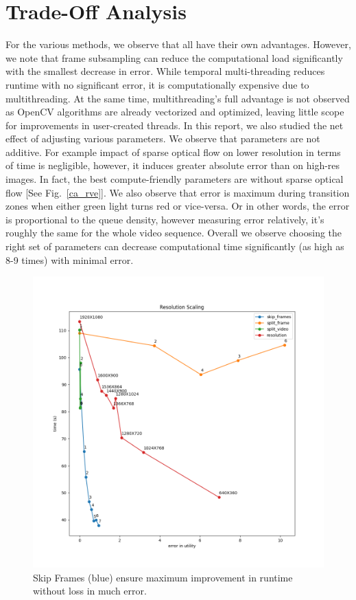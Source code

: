 \documentclass[conference]{IEEEtran}
\begin{document}
\section{Trade-Off Analysis}

For the various methods, we observe that all have their own advantages. However, we note that frame subsampling can reduce the computational load significantly with the smallest decrease in error.
While temporal multi-threading reduces runtime with no significant error, it is computationally expensive due to multithreading. At the same time, multithreading's full advantage is not 
observed as OpenCV algorithms are already vectorized and optimized, leaving little scope for improvements in user-created threads.
In this report, we also studied the net effect of adjusting various parameters. We observe that parameters are not additive. For example impact of sparse optical flow on lower resolution in terms of time is negligible, however, it induces greater absolute error than on high-res images.
In fact, the best compute-friendly parameters are without sparse optical flow [See Fig.~\ref{ca_rve}].
We also observe that error is maximum during transition zones when either green light turns red or vice-versa. Or in other words, the error is proportional to the queue density, however measuring error relatively, it's roughly the same for the whole video sequence. 
Overall we observe choosing the right set of parameters can decrease computational time significantly (as high as 8-9 times) with minimal error.


\begin{figure}[htbp]
\centerline{\includegraphics[scale=0.3]{plots/plot_all.png}}
\caption{Skip Frames (blue) ensure maximum improvement in runtime without loss in much error.}
\label{plot_all} 
\end{figure}
\end{document}
